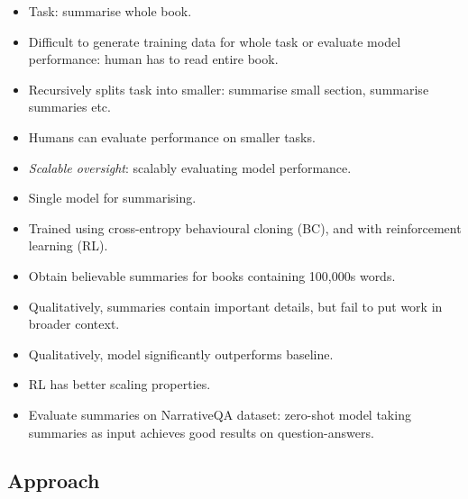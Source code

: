 \begin{itemize}
    \item Task: summarise whole book.
    \item Difficult to generate training data for whole task or evaluate model performance: human has to read entire book.
    \item Recursively splits task into smaller: summarise small section, summarise summaries etc.
    \item Humans can evaluate performance on smaller tasks.
    \item \emph{Scalable oversight}: scalably evaluating model performance.
    \item Single model for summarising.
    \item Trained using cross-entropy behavioural cloning (BC), and with reinforcement learning (RL).
    \item Obtain believable summaries for books containing 100,000s words.
    \item Qualitatively, summaries contain important details, but fail to put work in broader context.
    \item Qualitatively, model significantly outperforms baseline.
    \item RL has better scaling properties.
    \item Evaluate summaries on NarrativeQA dataset: zero-shot model taking summaries as input achieves good results on question-answers.
\end{itemize}


\subsection{Approach}

